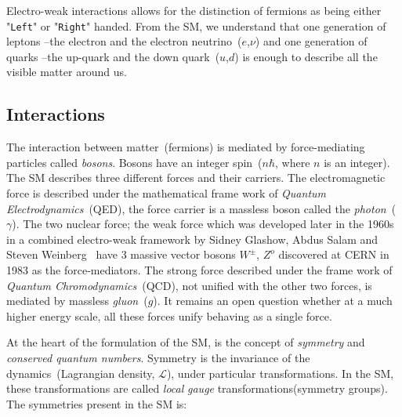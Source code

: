 
Electro-weak interactions allows for the distinction of fermions as being either "\texttt{Left}" or "\texttt{Right}" handed.  
From the SM, we understand that one generation of leptons --the electron and the electron neutrino~($e$,$\nu$) and one generation of quarks --the up-quark and the down quark~($u$,$d$) is enough to describe all the visible matter around us.
\subsection*{Interactions}
The interaction between matter~(fermions) is mediated by force-mediating particles called \textit{bosons}. Bosons have an integer spin~($n\hbar$, where $n$ is an integer). The SM describes three different forces and their carriers. The electromagnetic force is described under the mathematical frame work of \textit{Quantum Electrodynamics}~(QED), the force carrier is a massless boson called the \textit{photon}~($\gamma$). The two nuclear force; the weak force which was developed later in the 1960s in a combined electro-weak framework by Sidney Glashow, Abdus Salam and Steven Weinberg~\cite{SM} have 3 massive vector bosons $W^{\pm}$, $Z^{o}$ discovered at CERN in 1983 as the force-mediators. The strong force described under the frame work of \textit{Quantum Chromodynamics}~(QCD), not unified with the other two forces, is mediated by massless \textit{gluon}~($g$).  It remains an open question whether at a much higher energy scale, all these forces unify behaving as a single force.



 At the heart of the formulation of the SM, is the concept of \textit{symmetry} and \textit{conserved quantum numbers}. Symmetry is the invariance of the dynamics~(Lagrangian density, $\mathcal{L}$), under particular transformations. In the SM, these transformations are called \textit{local} \textit{gauge} transformations(symmetry groups). %
The symmetries present in the SM is:

